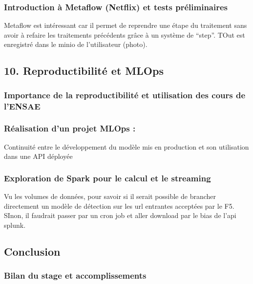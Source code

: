 \documentclass[
  letterpaper,
  DIV=11,
  numbers=noendperiod]{scrartcl}
\begin{document}
\subsubsection{Introduction à Metaflow (Netflix) et tests
préliminaires}\label{introduction-uxe0-metaflow-netflix-et-tests-pruxe9liminaires}

Metaflow est intéressant car il permet de reprendre une étape du
traitement sans avoir à refaire les traitements précédents grâce à un
système de ``step''. TOut est enregistré dans le minio de l'utilisateur
(photo).

\subsection{10. Reproductibilité et
MLOps}\label{reproductibilituxe9-et-mlops}

\subsubsection{Importance de la reproductibilité et utilisation des
cours de
l'ENSAE}\label{importance-de-la-reproductibilituxe9-et-utilisation-des-cours-de-lensae}

\subsubsection{Réalisation d'un projet MLOps
:}\label{ruxe9alisation-dun-projet-mlops}

Continuité entre le développement du modèle mis en production et son
utilisation dans une API déployée

\subsubsection{Exploration de Spark pour le calcul et le
streaming}\label{exploration-de-spark-pour-le-calcul-et-le-streaming}

Vu les volumes de données, pour savoir si il serait possible de brancher
directement un modèle de détection sur les url entrantes acceptées par
le F5. SInon, il faudrait passer par un cron job et aller download par
le bias de l'api splunk.

\subsection{Conclusion}\label{conclusion}

\subsubsection{Bilan du stage et
accomplissements}\label{bilan-du-stage-et-accomplissements}
\end{document}
